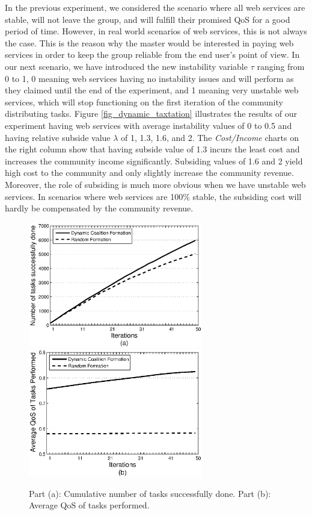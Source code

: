 \documentclass[10pt,journal,cspaper,compsoc]{IEEEtran}
\begin{document}
In the previous experiment, we considered the scenario where all
web services are stable, will not leave the group, and will
fulfill their promised QoS for a good period of time. However, in
real world scenarios of web services, this is not always the case.
This is the reason why the master would be interested in paying
web services in order to keep the group reliable from the end
user's point of view. In our next scenario, we have introduced the
new instability variable $\tau$ ranging from 0 to 1, 0 meaning web
services having no instability issues and will perform as they
claimed until the end of the experiment, and 1 meaning very
unstable web services, which will stop functioning on the first
iteration of the community distributing tasks. Figure
\ref{fig_dynamic_taxtation} illustrates the results of our
experiment having web services with average instability values of
0 to 0.5 and having relative subside value $\lambda$ of 1, 1.3,
1.6, and 2. The \emph{Cost/Income} charts on the right column show
that having subside value of 1.3 incurs the least cost and
increases the community income significantly. Subsiding values of
1.6 and 2 yield high cost to the community and only slightly
increase the community revenue. Moreover, the role of subsiding is
much more obvious when we have unstable web services. In scenarios
where web services are 100\% stable, the subsiding cost will
hardly be compensated by the community revenue.

\begin{figure}[!t]
\centering
\includegraphics[width=3in]{s2_task_done.eps}
\includegraphics[width=3in]{s2_task_qos.eps}
\caption{Part (a): Cumulative number of tasks successfully done.
Part (b): Average QoS of tasks performed.} \label{performancemany}
\end{figure}
\end{document}
